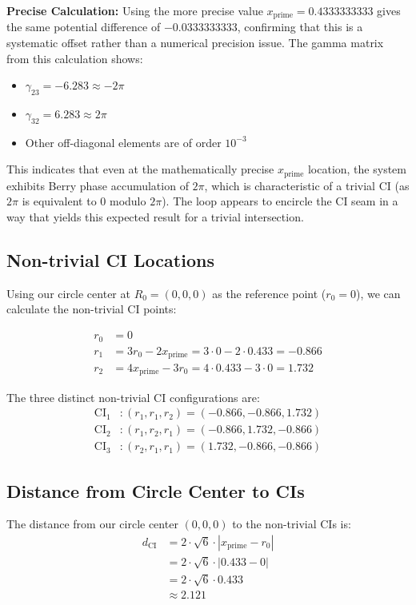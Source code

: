 \documentclass{article}
\begin{document}
\textbf{Precise Calculation:} Using the more precise value $x_{\text{prime}} = 0.4333333333$ gives the same potential difference of $-0.0333333333$, confirming that this is a systematic offset rather than a numerical precision issue. The gamma matrix from this calculation shows:
\begin{itemize}
    \item $\gamma_{23} = -6.283 \approx -2\pi$
    \item $\gamma_{32} = 6.283 \approx 2\pi$
    \item Other off-diagonal elements are of order $10^{-3}$
\end{itemize}

This indicates that even at the mathematically precise $x_{\text{prime}}$ location, the system exhibits Berry phase accumulation of $2\pi$, which is characteristic of a trivial CI (as $2\pi$ is equivalent to $0$ modulo $2\pi$). The loop appears to encircle the CI seam in a way that yields this expected result for a trivial intersection.


\subsection{Non-trivial CI Locations}

Using our circle center at $R_0 = (0, 0, 0)$ as the reference point ($r_0 = 0$), we can calculate the non-trivial CI points:

\begin{align}
r_0 &= 0 \\
r_1 &= 3r_0 - 2x_{\text{prime}} = 3 \cdot 0 - 2 \cdot 0.433 = -0.866 \\
r_2 &= 4x_{\text{prime}} - 3r_0 = 4 \cdot 0.433 - 3 \cdot 0 = 1.732
\end{align}

The three distinct non-trivial CI configurations are:
\begin{align}
\text{CI}_1 &: (r_1, r_1, r_2) = (-0.866, -0.866, 1.732) \\
\text{CI}_2 &: (r_1, r_2, r_1) = (-0.866, 1.732, -0.866) \\
\text{CI}_3 &: (r_2, r_1, r_1) = (1.732, -0.866, -0.866)
\end{align}

\subsection{Distance from Circle Center to CIs}

The distance from our circle center $(0, 0, 0)$ to the non-trivial CIs is:
\begin{align}
d_{\text{CI}} &= 2 \cdot \sqrt{6} \cdot |x_{\text{prime}} - r_0| \\
&= 2 \cdot \sqrt{6} \cdot |0.433 - 0| \\
&= 2 \cdot \sqrt{6} \cdot 0.433 \\
&\approx 2.121
\end{align}
\end{document}
